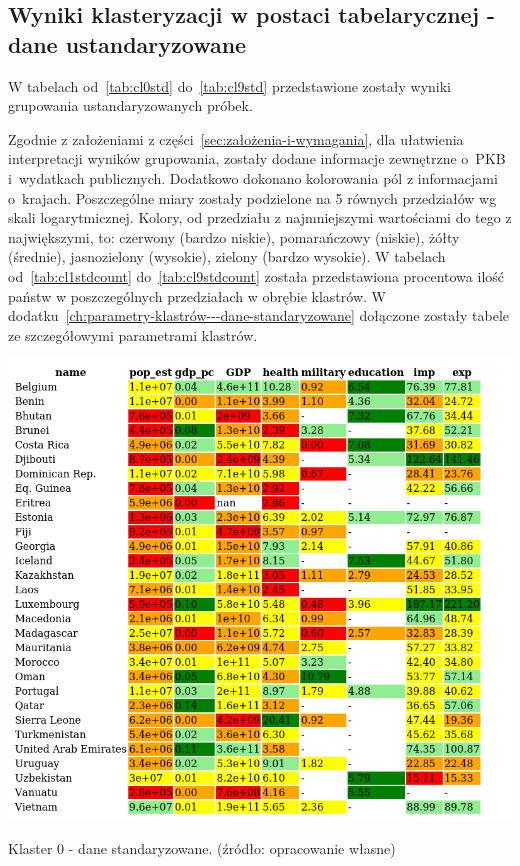 \documentclass[11pt]{report}
\begin{document}
    \subsection{Wyniki klasteryzacji w postaci tabelarycznej - dane ustandaryzowane}
    W tabelach od~\ref{tab:cl0std} do~\ref{tab:cl9std} przedstawione zostały wyniki grupowania ustandaryzowanych próbek.

    Zgodnie z założeniami z części~\ref{sec:założenia-i-wymagania}, dla ułatwienia interpretacji wyników grupowania, zostały dodane informacje zewnętrzne o~PKB i~wydatkach publicznych.
    Dodatkowo dokonano kolorowania pól z informacjami o~krajach.
    Poszczególne miary zostały podzielone na 5 równych przedziałów wg skali logarytmicznej.
    Kolory, od przedziału z najmniejszymi wartościami do tego z największymi, to: czerwony (bardzo niskie), pomarańczowy (niskie), żółty (średnie), jasnozielony (wysokie), zielony (bardzo wysokie).
    W tabelach od~\ref{tab:cl1stdcount} do~\ref{tab:cl9stdcount} została przedstawiona procentowa ilość państw w poszczególnych przedziałach w obrębie klastrów.
    W dodatku~\ref{ch:parametry-klastrów---dane-standaryzowane} dołączone zostały tabele ze szczegółowymi parametrami klastrów.

    \begin{table}[!htp]
        \centering
        \includegraphics[width=\linewidth]{tables/CLUST/cluster0stdkmeans.png}
        \caption{Klaster 0 - dane standaryzowane. (źródło: opracowanie własne)}
        \label{tab:cl0std}
    \end{table}
\end{document}
